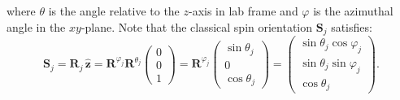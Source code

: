 \documentclass[aps, prx, nofootinbib, superscriptaddress]{revtex4-2}
\begin{document}
where $\theta$ is the angle relative to the $z$-axis in lab frame and $\varphi$ is the azimuthal angle in the $xy$-plane.
Note that the classical spin orientation $\mathbf{S}_j$ satisfies:
\begin{equation}
    \mathbf{S}_{j} 
    = \mathbf{R}_{j} \, \hat{\mathbf{z}} 
    = \mathbf{R}^{\varphi_{j}} \mathbf{R}^{\theta_{j}} 
    \begin{pmatrix} 
        0 \\ 0 \\ 1 
    \end{pmatrix} 
    = \mathbf{R}^{\varphi_j} 
    \begin{pmatrix} 
        \sin \theta_{j} \\ 0 \\ \cos \theta_{j} 
    \end{pmatrix} 
    = 
    \begin{pmatrix} 
        \sin \theta_{j} \cos \varphi_{j} \\ \sin \theta_{j} \sin \varphi_{j} \\ \cos \theta_{j} 
    \end{pmatrix}.
\end{equation}
\end{document}
